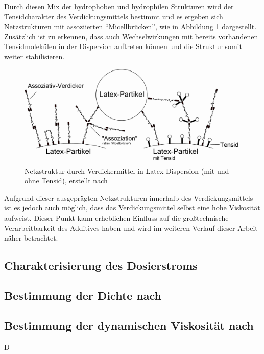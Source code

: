 Durch diesen Mix der hydrophoben und hydrophilen Strukturen wird der Tensidcharakter des Verdickungsmittels bestimmt und es ergeben sich Netzstrukturen mit assoziierten "`Micellbrücken"', wie in Abbildung \ref{fig: verdicker_anwendung} dargestellt. Zusätzlich ist zu erkennen, dass auch Wechselwirkungen mit bereits vorhandenen Tensidmolekülen in der Dispersion auftreten können und die Struktur somit weiter stabilisieren. \cite{Mezger.2016}

\begin{figure}[h!]
	\centering
	\includegraphics[width=1.0\textwidth]{img/verdicker_anwendung}
	\caption{Netzstruktur durch Verdickermittel in Latex-Dispersion (mit und ohne Tensid), \linebreak erstellt nach \cite{Mezger.2016}}
	\label{fig: verdicker_anwendung}
\end{figure}
\FloatBarrier

Aufgrund dieser ausgeprägten Netzstrukturen innerhalb des Verdickungsmittels ist es jedoch auch möglich, dass das Verdickungsmittel selbst eine hohe Viskosität aufweist. Dieser Punkt kann erheblichen Einfluss auf die großtechnische Verarbeitbarkeit des Additives haben und wird im weiteren Verlauf dieser Arbeit näher betrachtet.


\subsection{Charakterisierung des Dosierstroms}

\subsection*{Bestimmung der Dichte nach }

\subsection*{Bestimmung der dynamischen Viskosität nach }
D

